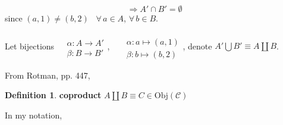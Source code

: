 \documentclass[twoside,landscape]{amsart}
\theoremstyle{plain}
\theoremstyle{definition}
\newtheorem{definition}{Definition}
\theoremstyle{remark}
\begin{document}
\begin{multicols*}{2}
\[
\Longrightarrow A' \cap B' = \emptyset 
\]
since $(a,1) \neq (b,2)$ \, $\forall \, a \in A$, $\forall \, b \in B$.

Let bijections $\begin{aligned} & \quad \\
  & \alpha : A \to A' \\
  & \beta : B \to B' \end{aligned}$, \qquad \, $\begin{aligned} & \quad \\
  & \alpha : a \mapsto (a,1) \\
  & \beta : b\mapsto (b,2) \end{aligned}$, denote $A'\bigcup B' \equiv A \coprod B$.

From Rotman, pp. 447,
\begin{definition}
\textbf{coproduct} $A \coprod B \equiv C \in \text{Obj}(\mathcal{C})$
  \end{definition}

In my notation,


\end{multicols*}
\end{document}
